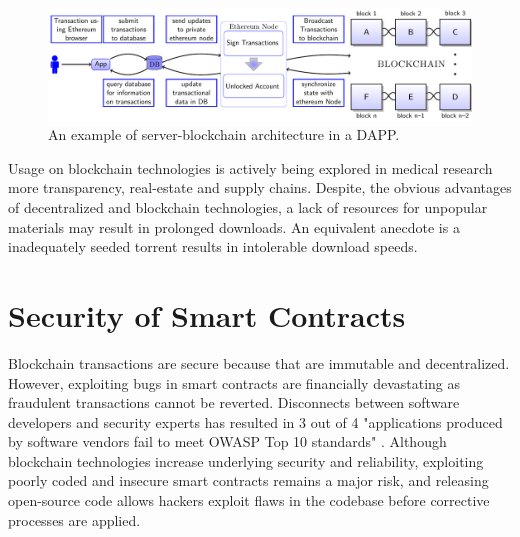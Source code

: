 \documentclass[12pt]{scrreprt}
\begin{document}
\begin{figure}[ht]
\centering
\includegraphics[width=1\linewidth]{ms-II/blockchainInSimpleApp.pdf}
\caption{An example of server-blockchain architecture in a DAPP.}
\label{fig:DApp}
\end{figure}
Usage on blockchain technologies is actively being explored in medical research \cite{pmid28357041} more transparency, real-estate and supply chains.
Despite, the obvious advantages of decentralized and blockchain technologies,  a lack of resources for unpopular materials may result in prolonged downloads. An equivalent anecdote is a inadequately seeded torrent results in intolerable download speeds. 

 \section{Security of Smart Contracts}
 
 Blockchain transactions are secure because that are immutable and decentralized. However, exploiting bugs in smart contracts are financially devastating \cite{funnyJoke:Online} as fraudulent transactions cannot be reverted. Disconnects between software developers and security experts has resulted in 3 out of 4 "applications produced by software vendors fail to meet OWASP Top 10 standards" \cite{veraCode:Report}. Although blockchain technologies increase underlying security and reliability, exploiting poorly coded and insecure smart contracts remains a major risk, and releasing open-source code allows hackers exploit flaws in the codebase before corrective processes are applied.  
\end{document}
